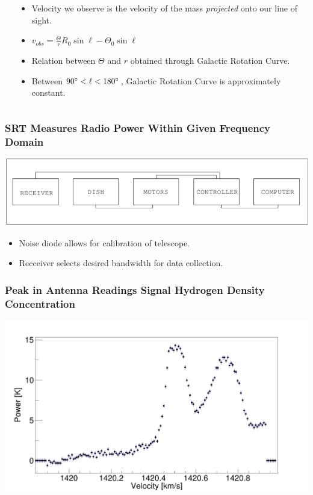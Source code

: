 \documentclass{beamer}
\begin{document}
\begin{frame}
\begin{columns}
\begin{column}{0.4\textwidth}
\end{column}
\begin{column}{0.6\textwidth}
  \begin{itemize}
    \item Velocity we observe is the velocity of the mass \textit{projected} onto our line of sight. 
    \item $v_{obs} = \frac{\Theta}{r} R_0 \sin \ell - \Theta_0 \sin \ell$
    \item Relation between $\Theta$ and $r$ obtained through Galactic Rotation Curve.
    \item Between $90\degree < \ell < 180\degree$, Galactic Rotation Curve is approximately constant.
  \end{itemize} 
\end{column}
\end{columns}
\end{frame}

\begin{frame}
  \frametitle{SRT Measures Radio Power Within Given Frequency Domain}
  \includegraphics[width=1\textwidth]{block}
  \begin{itemize}
    \item Noise diode allows for calibration of telescope.
    \item Recceiver selects desired bandwidth for data collection.
  \end{itemize}
\end{frame}

\begin{frame}
  \frametitle{Peak in Antenna Readings Signal Hydrogen Density Concentration}
  \includegraphics[width=1\textwidth]{data_freq_small.png}
\end{frame}
\end{document}
